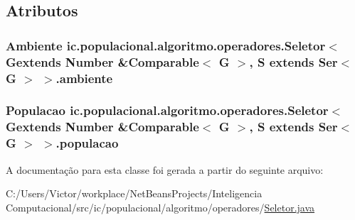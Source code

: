 \subsection{Atributos}
\hypertarget{classic_1_1populacional_1_1algoritmo_1_1operadores_1_1_seletor_3_01_gextends_01_number_01_6_comp1cb45fdcf61805e0533898ec8098c80d_ae37847f40473f702dbee3d27875daf10}{
\subsubsection[{ambiente}]{\setlength{\rightskip}{0pt plus 5cm}Ambiente ic.\-populacional.\-algoritmo.\-operadores.\-Seletor$<$ Gextends Number \&Comparable$<$ G $>$, S extends Ser$<$ G $>$ $>$.ambiente\hspace{0.3cm}{\ttfamily [protected]}}}\label{classic_1_1populacional_1_1algoritmo_1_1operadores_1_1_seletor_3_01_gextends_01_number_01_6_comp1cb45fdcf61805e0533898ec8098c80d_ae37847f40473f702dbee3d27875daf10}
\hypertarget{classic_1_1populacional_1_1algoritmo_1_1operadores_1_1_seletor_3_01_gextends_01_number_01_6_comp1cb45fdcf61805e0533898ec8098c80d_adcfe10d9432643be21b2f9e605a6338c}{
\subsubsection[{populacao}]{\setlength{\rightskip}{0pt plus 5cm}Populacao ic.\-populacional.\-algoritmo.\-operadores.\-Seletor$<$ Gextends Number \&Comparable$<$ G $>$, S extends Ser$<$ G $>$ $>$.populacao\hspace{0.3cm}{\ttfamily [protected]}}}\label{classic_1_1populacional_1_1algoritmo_1_1operadores_1_1_seletor_3_01_gextends_01_number_01_6_comp1cb45fdcf61805e0533898ec8098c80d_adcfe10d9432643be21b2f9e605a6338c}


A documentação para esta classe foi gerada a partir do seguinte arquivo\-:\begin{DoxyCompactItemize}
\item 
C\-:/\-Users/\-Victor/workplace/\-Net\-Beans\-Projects/\-Inteligencia Computacional/src/ic/populacional/algoritmo/operadores/\hyperlink{_seletor_8java}{Seletor.\-java}\end{DoxyCompactItemize}
